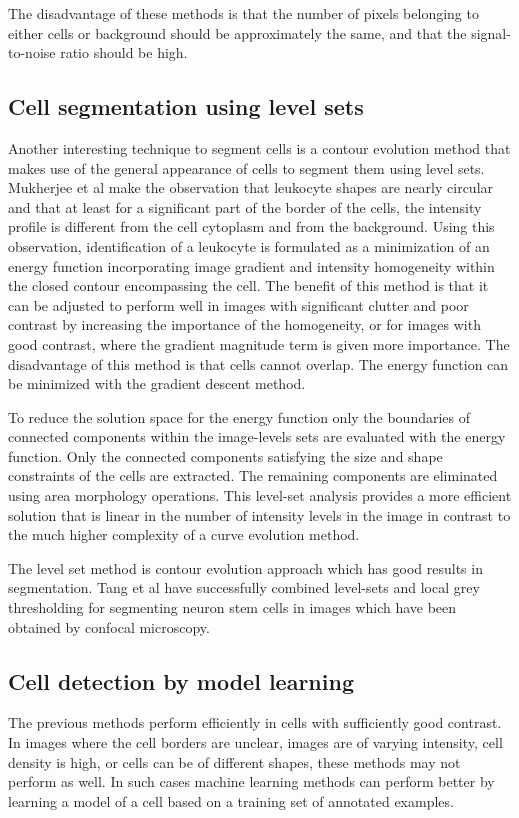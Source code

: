 The disadvantage of these methods is that the number of pixels belonging to either cells or background should be approximately the same, and that the signal-to-noise ratio should be high.

\subsection{Cell segmentation using level sets \statusfirstdraft}

Another interesting technique to segment cells is a contour evolution method that makes use of the general appearance of cells to segment them using level sets. Mukherjee et al \cite{mukherjee04} make the observation that leukocyte shapes are nearly circular and that at least for a significant part of the border of the cells, the intensity profile is different from the cell cytoplasm and from the background. Using this observation, identification of a leukocyte is formulated as a minimization of an energy function incorporating image gradient and intensity homogeneity within the closed contour encompassing the cell. The benefit of this method is that it can be adjusted to perform well in images with significant clutter and poor contrast by increasing the importance of the homogeneity, or for images with good contrast, where the gradient magnitude term is given more importance. The disadvantage of this method is that cells cannot overlap. The energy function can be minimized with the gradient descent method.

To reduce the solution space for the energy function only the boundaries of connected components within the image-levels sets are evaluated with the energy function. Only the connected components satisfying the size and shape constraints of the cells are extracted. The remaining components are eliminated using area morphology operations. This level-set analysis provides a more efficient solution that is linear in the number of intensity levels in the image in contrast to the much higher complexity of a curve evolution method.

The level set method is contour evolution approach which has good results in segmentation. Tang et al \cite{tang} have successfully combined level-sets and local grey thresholding \cite{xu10} for segmenting neuron stem cells in images which have been obtained by confocal microscopy.

\subsection{Cell detection by model learning \statusfirstdraft}
The previous methods perform efficiently in cells with sufficiently good contrast. In images where the cell borders are unclear, images are of varying intensity, cell density is high, or cells can be of different shapes, these methods may not perform as well. In such cases machine learning methods can perform better by learning a model of a cell based on a training set of annotated examples.

